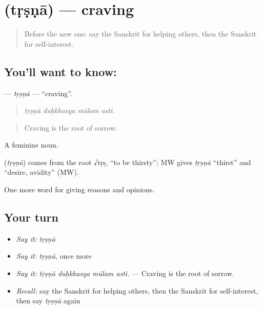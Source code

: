 \section[\texorpdfstring{\sk{तृष्णा} (tṛṣṇā)}{तृष्णा (tṛṣṇā)}]{ (tṛṣṇā) — craving}

\label{lesson:SA-C359-trsna}



\begin{quote}
Before the new one: say the Sanskrit for helping others, then the Sanskrit for self-interest.
\end{quote}

\subsection*{You'll want to know: }
\textbf{} — \emph{tṛṣṇā} — \textquotedblleft{}craving\textquotedblright{}.

\begin{quote}
   
\end{quote}

\begin{quote}
\emph{tṛṣṇā duḥkhasya mūlam asti.}
\end{quote}

\begin{quote}
Craving is the root of sorrow.
\end{quote}

A feminine noun.

\begin{cousinweb}
\textbf{} (\emph{tṛṣṇā}) comes from the root √tṛṣ, \textquotedblleft{}to be thirsty\textquotedblright{}; MW gives \emph{tṛṣṇā} \textquotedblleft{}thirst\textquotedblright{} and \textquotedblleft{}desire, avidity\textquotedblright{} (MW).
\end{cousinweb}

\begin{grammarlens}[title={What you've built}]
One more word for giving reasons and opinions.
\end{grammarlens}

\subsection*{Your turn}
\begin{itemize}
\raggedright
  \item \emph{Say it:} \emph{tṛṣṇā}
  \item \emph{Say it:} \emph{tṛṣṇā}, once more
  \item \emph{Say it:} \emph{tṛṣṇā duḥkhasya mūlam asti.} — Craving is the root of sorrow.
  \item \emph{Recall:} say the Sanskrit for helping others, then the Sanskrit for self-interest, then say \emph{tṛṣṇā} again
\end{itemize}

